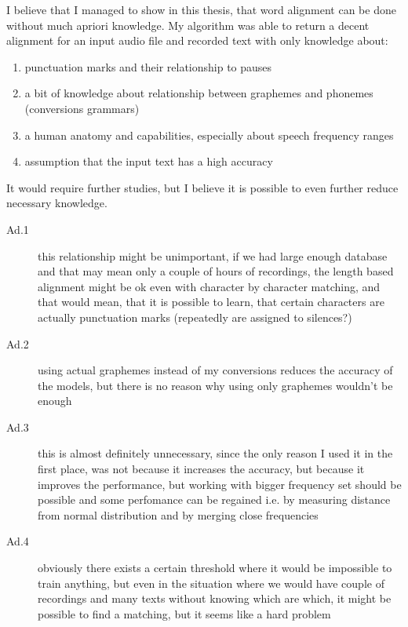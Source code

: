 \documentclass[12pt,a4paper,english]{article}
\begin{document}
I believe that I managed to show in this thesis, that word alignment can be done without much apriori knowledge.
My algorithm was able to return a decent alignment for an input audio file and recorded text with only knowledge about:
\begin{enumerate}
    \item punctuation marks and their relationship to pauses
    \item a bit of knowledge about relationship between graphemes and phonemes (conversions grammars)
    \item a human anatomy and capabilities, especially about speech frequency ranges
    \item assumption that the input text has a high accuracy
\end{enumerate}
It would require further studies, but I believe it is possible to even further reduce necessary knowledge.
\begin{description}
    \item[Ad.1] this relationship might be unimportant, if we had large enough database and that may mean only a couple of hours of recordings, \newline
    the length based alignment might be ok even with character by character matching, and that would mean, that it is possible to learn, that certain characters are actually punctuation marks (repeatedly are assigned to silences?)
    \item[Ad.2] using actual graphemes instead of my conversions reduces the accuracy of the models, but there is no reason why using only graphemes wouldn't be enough
    \item[Ad.3] this is almost definitely unnecessary, since the only reason I used it in the first place, was not because it increases the accuracy, but because it improves the performance, but working with bigger frequency set should be possible and some perfomance can be regained i.e. by measuring distance from normal distribution and by merging close frequencies
    \item[Ad.4] obviously there exists a certain threshold where it would be impossible to train anything, but even in the situation where we would have couple of recordings and many texts without knowing which are which, it might be possible to find a matching, but it seems like a hard problem
\end{description}

\newpage
\end{document}
